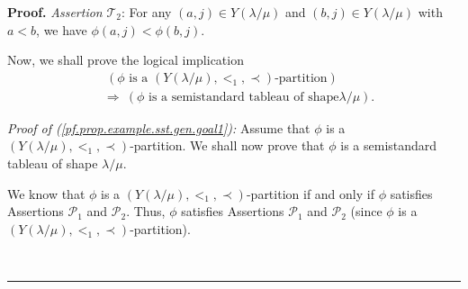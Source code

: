 \documentclass[numbers=enddot,12pt,final,onecolumn,notitlepage,abstracton]{scrartcl}
\theoremstyle{definition}
\newenvironment{proof}[1][Proof]{\noindent\textbf{#1.} }{\ \rule{0.5em}{0.5em}}
\newenvironment{verlong}{}{}
\begin{document}
\begin{verlong}
\begin{footnotesize}
\begin{proof}
\textit{Assertion }$\mathcal{T}_{2}$: For any $\left(  a,j\right)  \in
Y\left(  \lambda/\mu\right)  $ and $\left(  b,j\right)  \in Y\left(
\lambda/\mu\right)  $ with $a<b$, we have $\phi\left(  a,j\right)
<\phi\left(  b,j\right)  $.

Now, we shall prove the logical implication%
\begin{align}
&  \ \left(  \phi\text{ is a }\left(  Y\left(  \lambda/\mu\right)
,<_{1},\prec\right)  \text{-partition}\right) \nonumber\\
&  \Longrightarrow\ \left(  \phi\text{ is a semistandard tableau of shape
}\lambda/\mu\right)  . \label{pf.prop.example.sst.gen.goal1}%
\end{align}


\textit{Proof of (\ref{pf.prop.example.sst.gen.goal1}):} Assume that $\phi$ is
a $\left(  Y\left(  \lambda/\mu\right)  ,<_{1},\prec\right)  $-partition. We
shall now prove that $\phi$ is a semistandard tableau of shape $\lambda/\mu$.

We know that $\phi$ is a $\left(  Y\left(  \lambda/\mu\right)  ,<_{1}%
,\prec\right)  $-partition if and only if $\phi$ satisfies Assertions
$\mathcal{P}_{1}$ and $\mathcal{P}_{2}$. Thus, $\phi$ satisfies Assertions
$\mathcal{P}_{1}$ and $\mathcal{P}_{2}$ (since $\phi$ is a $\left(  Y\left(
\lambda/\mu\right)  ,<_{1},\prec\right)  $-partition).


\end{proof}
\end{footnotesize}
\end{verlong}
\end{document}
